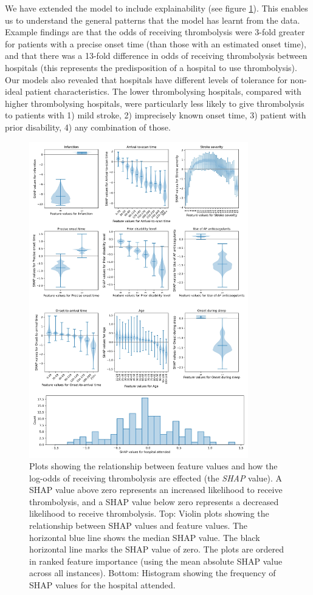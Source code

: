 We have extended the model to include explainability \cite{pearn_what_2023} (see figure \ref{fig:shap}). This enables us to understand the general patterns that the model has learnt from the data. Example findings are that the odds of receiving thrombolysis were 3-fold greater for patients with a precise onset time (than those with an estimated onset time), and that there was a 13-fold difference in odds of receiving thrombolysis between hospitals (this represents the predisposition of a hospital to use thrombolysis). Our models also revealed that hospitals have different levels of tolerance for non-ideal patient characteristics. The lower thrombolysing hospitals, compared with higher thrombolysing hospitals, were particularly less likely to give thrombolysis to patients with 1) mild stroke, 2) imprecisely known onset time, 3) patient with prior disability, 4) any combination of those.

\begin{figure}
\centering
\includegraphics[width=0.85\textwidth]{./images/fig_1}
\caption{Plots showing the relationship between feature values and how the log-odds of receiving thrombolysis are effected (the \textit{SHAP} value). A SHAP value above zero represents an increased likelihood to receive thrombolysis, and a SHAP value below zero represents a decreased likelihood to receive thrombolysis. Top: Violin plots showing the relationship between SHAP values and feature values. The horizontal blue line shows the median SHAP value. The black horizontal line marks the SHAP value of zero. The plots are ordered in ranked feature importance (using the mean absolute SHAP value across all instances). Bottom: Histogram showing the frequency of SHAP values for the hospital attended.}
\label{fig:shap}
\end{figure}

